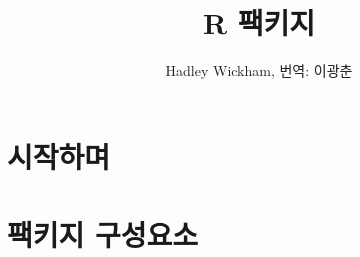 \documentclass{book}
\title{R 팩키지}
\author{Hadley Wickham, 번역: 이광춘}
\begin{document}
\frontmatter
\maketitle

\tableofcontents

\mainmatter

\part{시작하며}


\part{팩키지 구성요소}









%
%
%
%
\end{document}
